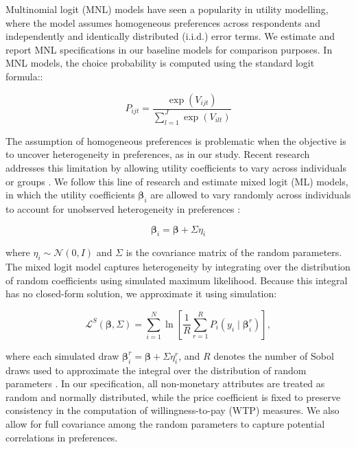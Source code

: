 \documentclass[3p,11pt ]{elsarticle}
\begin{document}
Multinomial logit (MNL) models have seen a popularity in utility modelling,
where the model assumes homogeneous preferences across respondents and independently and identically distributed (i.i.d.) error terms.
We estimate and report MNL specifications in our baseline models for comparison purposes.
In MNL models,
the choice probability is computed using the standard logit formula::

\begin{equation}
P_{ijt} = \frac{\exp(V_{ijt})}{\sum_{l=1}^{J} \exp(V_{ilt})}
\end{equation}

The assumption of homogeneous preferences is problematic when the objective is to uncover heterogeneity in preferences, as in our study. 
Recent research addresses this limitation by allowing utility coefficients to vary across individuals or groups \citep{aitkenOlderHomebuyersPrefer2024, zhaoUsingConjointAnalysis2023, caplanMeasuringHeterogeneousPreferences2021}. 
We follow this line of research and estimate mixed logit (ML) models, in which the utility coefficients \( \boldsymbol{\beta}_i \) are allowed to vary randomly across individuals to account for unobserved heterogeneity in preferences \citep{mcfaddenMixedMNLModels2000}:


\begin{equation}
\boldsymbol{\beta}_i = \boldsymbol{\beta} + \Sigma \eta_i
\end{equation}

\noindent where \( \eta_i \sim \mathcal{N}(0, I) \) and \( \Sigma \) is the covariance matrix of the random parameters. 
The mixed logit model captures heterogeneity by integrating over the distribution of random coefficients using simulated maximum likelihood. 
Because this integral has no closed-form solution, we approximate it using simulation:

\begin{equation}
\mathcal{L}^S(\boldsymbol{\beta}, \Sigma) = \sum_{i=1}^{N} 
\ln \left[ \frac{1}{R} \sum_{r=1}^{R} 
P_i(y_i \mid \boldsymbol{\beta}_i^{r}) \right],
\end{equation}

\noindent where each simulated draw \( \boldsymbol{\beta}_i^{r} = \boldsymbol{\beta} + \Sigma \eta_i^{r} \), and \( R \) denotes the number of Sobol draws used to approximate the integral over the distribution of random parameters \citep{trainDiscreteChoiceMethods2003}. 
In our specification, all non-monetary attributes are treated as random and normally distributed, while the price coefficient is fixed to preserve consistency in the computation of willingness-to-pay (WTP) measures. 
We also allow for full covariance among the random parameters to capture potential correlations in preferences.
\end{document}
